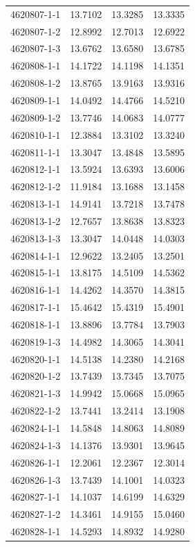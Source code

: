 \begin{longtable}{lrrr}
4620807-1-1 & 13.7102 & 13.3285 & 13.3335 \\
4620807-1-2 & 12.8992 & 12.7013 & 12.6922 \\
4620807-1-3 & 13.6762 & 13.6580 & 13.6785 \\
4620808-1-1 & 14.1722 & 14.1198 & 14.1351 \\
4620808-1-2 & 13.8765 & 13.9163 & 13.9316 \\
4620809-1-1 & 14.0492 & 14.4766 & 14.5210 \\
4620809-1-2 & 13.7746 & 14.0683 & 14.0777 \\
4620810-1-1 & 12.3884 & 13.3102 & 13.3240 \\
4620811-1-1 & 13.3047 & 13.4848 & 13.5895 \\
4620812-1-1 & 13.5924 & 13.6393 & 13.6006 \\
4620812-1-2 & 11.9184 & 13.1688 & 13.1458 \\
4620813-1-1 & 14.9141 & 13.7218 & 13.7478 \\
4620813-1-2 & 12.7657 & 13.8638 & 13.8323 \\
4620813-1-3 & 13.3047 & 14.0448 & 14.0303 \\
4620814-1-1 & 12.9622 & 13.2405 & 13.2501 \\
4620815-1-1 & 13.8175 & 14.5109 & 14.5362 \\
4620816-1-1 & 14.4262 & 14.3570 & 14.3815 \\
4620817-1-1 & 15.4642 & 15.4319 & 15.4901 \\
4620818-1-1 & 13.8896 & 13.7784 & 13.7903 \\
4620819-1-3 & 14.4982 & 14.3065 & 14.3041 \\
4620820-1-1 & 14.5138 & 14.2380 & 14.2168 \\
4620820-1-2 & 13.7439 & 13.7345 & 13.7075 \\
4620821-1-3 & 14.9942 & 15.0668 & 15.0965 \\
4620822-1-2 & 13.7441 & 13.2414 & 13.1908 \\
4620824-1-1 & 14.5848 & 14.8063 & 14.8089 \\
4620824-1-3 & 14.1376 & 13.9301 & 13.9645 \\
4620826-1-1 & 12.2061 & 12.2367 & 12.3014 \\
4620826-1-3 & 13.7439 & 14.1001 & 14.0323 \\
4620827-1-1 & 14.1037 & 14.6199 & 14.6329 \\
4620827-1-2 & 14.3461 & 14.9155 & 15.0460 \\
4620828-1-1 & 14.5293 & 14.8932 & 14.9280 \\

\end{longtable}
